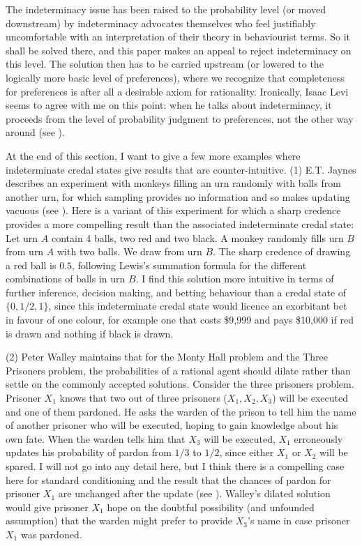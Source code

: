 \documentclass[11pt]{article}
\begin{document}
The indeterminacy issue has been raised to the probability level (or
moved downstream) by indeterminacy advocates themselves who feel
justifiably uncomfortable with an interpretation of their theory in
behaviourist terms. So it shall be solved there, and this paper makes
an appeal to reject indeterminacy on this level. The solution then has
to be carried upstream (or lowered to the logically more basic level
of preferences), where we recognize that completeness for preferences
is after all a desirable axiom for rationality. Ironically, Isaac Levi
seems to agree with me on this point: when he talks about
indeterminacy, it proceeds from the level of probability judgment to
preferences, not the other way around (see ).

At the end of this section, I want to give a few more examples where
indeterminate credal states give results that are counter-intuitive.
(1) E.T. Jaynes describes an experiment with monkeys filling an urn
randomly with balls from another urn, for which sampling provides no
information and so makes updating vacuous (see
). Here is a variant of this
experiment for which a sharp credence provides a more compelling
result than the associated indeterminate credal state: Let urn $A$
contain 4 balls, two red and two black. A monkey randomly fills urn
$B$ from urn $A$ with two balls. We draw from urn $B$. The sharp
credence of drawing a red ball is $0.5$, following Lewis's summation
formula for the different combinations of balls in urn $B$. I find
this solution more intuitive in terms of further inference, decision
making, and betting behaviour than a credal state of $\{0,1/2,1\}$,
since this indeterminate credal state would licence an exorbitant bet
in favour of one colour, for example one that costs \$9,999 and pays
\$10,000 if red is drawn and nothing if black is drawn.

(2) Peter Walley maintains that for the Monty Hall problem and the
Three Prisoners problem, the probabilities of a rational agent should
dilate rather than settle on the commonly accepted solutions. Consider
the three prisoners problem. Prisoner $X_{1}$ knows that two out of
three prisoners ($X_{1},X_{2},X_{3}$) will be executed and one of them
pardoned. He asks the warden of the prison to tell him the name of
another prisoner who will be executed, hoping to gain knowledge about
his own fate. When the warden tells him that $X_{3}$ will be executed,
$X_{1}$ erroneously updates his probability of pardon from $1/3$ to
$1/2$, since either $X_{1}$ or $X_{2}$ will be spared. I will not go
into any detail here, but I think there is a compelling case here for
standard conditioning and the result that the chances of pardon for
prisoner $X_{1}$ are unchanged after the update (see
). Walley's dilated solution would give
prisoner $X_{1}$ hope on the doubtful possibility (and unfounded
assumption) that the warden might prefer to provide $X_{3}$'s name in
case prisoner $X_{1}$ was pardoned.
\end{document}
